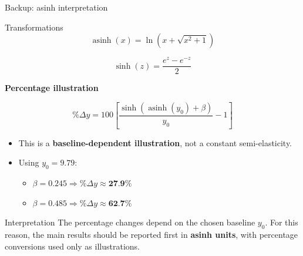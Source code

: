 \documentclass[aspectratio=169,10pt]{beamer}
\begin{document}
\begin{frame}{Backup: asinh interpretation}

\small

\begin{block}{Transformations}
\[
\operatorname{asinh}(x)
=
\ln\!\left(x+\sqrt{x^2+1}\right)
\]

\[
\sinh(z)
=
\frac{e^z-e^{-z}}{2}
\]
\end{block}

\vspace{0.15em}

\textbf{Percentage illustration}

\[
\%\Delta y =
100\left[
\frac{
\sinh\!\left(
\operatorname{asinh}(y_0)+\beta
\right)
}{
y_0
}
-1
\right]
\]

\begin{itemize}
    \setlength{\itemsep}{0.25em}

    \item This is a \textbf{baseline-dependent illustration},
    not a constant semi-elasticity.

    \item Using \(y_0=9.79\):

    \begin{itemize}
        \item \(\beta=0.245
        \Rightarrow
        \%\Delta y \approx \textbf{27.9\%}\)

        \item \(\beta=0.485
        \Rightarrow
        \%\Delta y \approx \textbf{62.7\%}\)
    \end{itemize}

\end{itemize}

\begin{alertblock}{Interpretation}
\footnotesize
The percentage changes depend on the chosen baseline \(y_0\).
For this reason, the main results should be reported first in
\textbf{asinh units}, with percentage conversions used only as illustrations.
\end{alertblock}

\end{frame}
\end{document}
